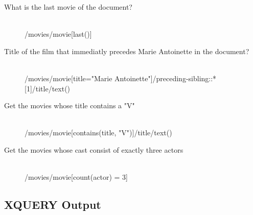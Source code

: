 \documentclass[xPath&xQuery.tex]{subfiles}
\begin{document}
\begin{description}
  \item[What is the last movie of the document?] \hfill \\
  /movies/movie[last()]
  
  \item[Title of the film that immediatly precedes Marie Antoinette in the document?] \hfill \\
  /movies/movie[title="Marie Antoinette"]/preceding-sibling::*[1]/title/text()
  
  \item[Get the movies whose title contains a "V"] \hfill \\
  /movies/movie[contains(title, "V")]/title/text()
  
  \item[Get the movies whose cast consist of exactly three actors] \hfill \\
    /movies/movie[count(actor) = 3]
\end{description} 

\subsection{XQUERY Output}
\end{document}
